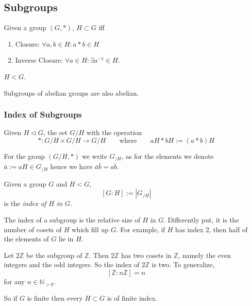 \subsection{Subgroups}
\begin{definition}[Subgroup]
   Given a group \((G, \ast)\), \(H \subset G\) iff
   \begin{enumerate}[label=\roman*, align=Center]
      \item Closure: \(\forall a, b \in H: a \ast b \in H\)
      \item Inverse Closure: \(\forall a \in H: \exists a^{-1} \in H\).
   \end{enumerate}
\end{definition}
\begin{remark}[Notation]
   \(H < G\).
\end{remark}
\begin{remark}
   Subgroups of abelian groups are also abelian.
\end{remark}

\subsubsection{Index of Subgroups}
\begin{definition}
   Given \(H \triangleleft G\), the set \(G/H\) with the operation
   \[\ast: G/H \times G/H \to G/H \qquad\text{where}\qquad aH \ast bH := (a \ast b)H\]
\end{definition}
\begin{remark}[Notation]
   For the group \((G/H, \ast)\) we write \(G_{/H}\), as for the elements we denote \(\bar{a} := aH \in G_{/H}\) hence we have \(\bar{a}\bar{b} = \overline{ab}\).
\end{remark}

\begin{definition}
   Given a group \(G\) and \(H < G\),
   \[[G:H] := |G_{/H}|\]
   is the \emph{index of \(H\) in \(G\)}.
\end{definition}
\begin{remark}[Intuition]
   The index of a subgroup is the relative size of \(H\) in \(G\).
   Differently put, it is the number of cosets of \(H\) which fill up \(G\).
   For example, if \(H\) has index 2, then half of the elements of \(G\) lie in \(H\).
\end{remark}
\begin{example}
   Let \(2\mathbb{Z}\) be the subgroup of \(\mathbb{Z}\).
   Then \(2\mathbb{Z}\) has two cosets in \(\mathbb{Z}\), namely the even integers and the odd integers.
   So the index of \(2\mathbb{Z}\) is two.
   To generalize,
   \[[\mathbb{Z} : n\mathbb{Z}] = n\]
   for any \(n \in \mathbb{N}_{>0}\).
\end{example}
\begin{remark}
   So if \(G\) is finite then every \(H \subset G\) is of finite index.
\end{remark}

